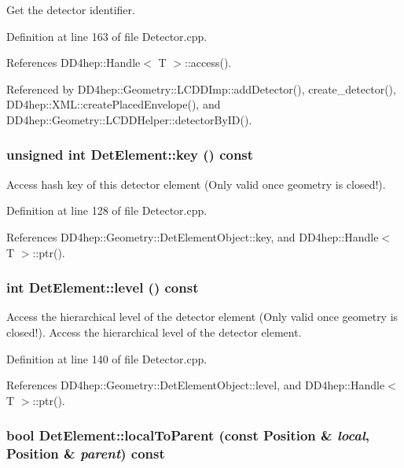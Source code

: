 Get the detector identifier. 

Definition at line 163 of file Detector.cpp.

References DD4hep::Handle$<$ T $>$::access().

Referenced by DD4hep::Geometry::LCDDImp::addDetector(), create\_\-detector(), DD4hep::XML::createPlacedEnvelope(), and DD4hep::Geometry::LCDDHelper::detectorByID().\hypertarget{class_d_d4hep_1_1_geometry_1_1_det_element_ad3a90491007d6e3d4656b33d09466b07}{
\subsubsection[{key}]{\setlength{\rightskip}{0pt plus 5cm}unsigned int DetElement::key () const}}
\label{class_d_d4hep_1_1_geometry_1_1_det_element_ad3a90491007d6e3d4656b33d09466b07}


Access hash key of this detector element (Only valid once geometry is closed!). 

Definition at line 128 of file Detector.cpp.

References DD4hep::Geometry::DetElementObject::key, and DD4hep::Handle$<$ T $>$::ptr().\hypertarget{class_d_d4hep_1_1_geometry_1_1_det_element_a240671f969600e1f707085d01fd62ec9}{
\subsubsection[{level}]{\setlength{\rightskip}{0pt plus 5cm}int DetElement::level () const}}
\label{class_d_d4hep_1_1_geometry_1_1_det_element_a240671f969600e1f707085d01fd62ec9}


Access the hierarchical level of the detector element (Only valid once geometry is closed!). Access the hierarchical level of the detector element. 

Definition at line 140 of file Detector.cpp.

References DD4hep::Geometry::DetElementObject::level, and DD4hep::Handle$<$ T $>$::ptr().\hypertarget{class_d_d4hep_1_1_geometry_1_1_det_element_a9f2bba52865005abe8be8ccb3f19cb63}{
\subsubsection[{localToParent}]{\setlength{\rightskip}{0pt plus 5cm}bool DetElement::localToParent (const {\bf Position} \& {\em local}, \/  {\bf Position} \& {\em parent}) const}}
\label{class_d_d4hep_1_1_geometry_1_1_det_element_a9f2bba52865005abe8be8ccb3f19cb63}


